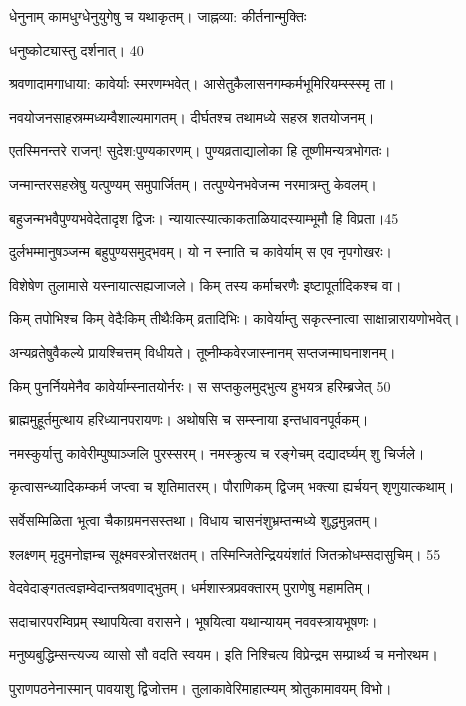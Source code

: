 धेनुनाम् कामधुग्धेनुयुगेषु च यथाकृतम्।
 जाह्नव्या: कीर्तनान्मुक्तिः 

धनुष्कोट्यास्तु दर्शनात्। 40

 श्रवणादामगाधाया: कावेर्याः स्मरणम्भवेत्।
 आसेतुकैलासनगम्कर्मभूमिरियम्स्स्स्मृ ता।

 नवयोजनसाहस्रम्मध्यम्वैशाल्यमागतम्।
 दीर्घतश्च तथामध्ये सहस्र शतयोजनम्।

 एतस्मिनन्तरे राजन्! सुदेश:पुण्यकारणम्।
 पुण्यव्रताद्यालोका हि तूष्णीमन्यत्रभोगतः।

 जन्मान्तरसहस्रेषु यत्पुण्यम् समुपार्जितम्।
 तत्पुण्येनभवेजन्म नरमात्रम्तु केवलम्।

 बहुजन्मभवैपुण्यभवेदेतादृश द्विजः।
 न्यायात्स्यात्काकताळियादस्याम्भूमौ हि विप्रता।45 

दुर्लभम्मानुषञ्जन्म बहुपुण्यसमुद्भवम्।
यो न स्नाति च कावेर्याम् स एव नृपगोखरः।

विशेषेण तुलामासे यस्नायात्सह्यजाजले।
 किम् तस्य कर्माचरणैः इष्टापूर्तादिकश्च वा।

 किम् तपोभिश्च किम् वेदैःकिम् तीथैःकिम् व्रतादिभिः।
 कावेर्याम्तु सकृत्स्नात्वा साक्षान्नारायणोभवेत्।

 अन्यव्रतेषुवैकल्ये प्रायश्चित्तम् विधीयते।
 तूष्नीम्कवेरजास्नानम् सप्तजन्माघनाशनम्।

 किम् पुनर्नियमेनैव कावेर्याम्स्नातयोर्नरः।
 स सप्तकुलमुद्भुत्य हुभयत्र हरिम्ब्रजेत् 50

 ब्राह्ममुहूर्तमुत्थाय हरिध्यानपरायणः।
 अथोषसि च सम्स्नाया इन्तधावनपूर्वकम्।

 नमस्कुर्यात्तु कावेरीम्पुष्पाञ्जलि पुरस्सरम्।
 नमस्क्रुत्य च रङ्गेचम् दद्यादर्घ्यम् शु चिर्जले।

 कृत्वासन्ध्यादिकम्कर्म जप्त्वा च शृतिमातरम्।
 पौराणिकम् द्विजम् भक्त्या ह्यर्चयन् शृणुयात्कथाम्।

 सर्वेसम्मिळिता भूत्वा चैकाग्रमनसस्तथा।
 विधाय चासनंशुभ्रम्तन्मध्ये शुद्धमुन्नतम्।

 श्लक्ष्णम् मृदुमनोज्ञम्च सूक्ष्मवस्त्रोत्तरक्षतम्।
 तस्मिन्जितेन्द्रिययंशांतं जितक्रोधम्सदासुचिम्। 55

 वेदवेदाङ्गतत्वज्ञम्वेदान्तश्रवणाद्भुतम्।
 धर्मशास्त्रप्रवक्तारम् पुराणेषु महामतिम्।

सदाचारपरम्विप्रम् स्थापयित्वा वरासने।
 भूषयित्वा यथान्यायम् नववस्त्रायभूषणः।

 मनुष्यबुद्धिम्सन्त्यज्य व्यासो सौ वदति स्वयम।
 इति निश्चित्य विप्रेन्द्रम सम्प्रार्थ्य च मनोरथम।

 पुराणपठनेनास्मान् पावयाशु द्विजोत्तम।
 तुलाकावेरिमाहात्म्यम् श्रोतुकामावयम् विभो।

